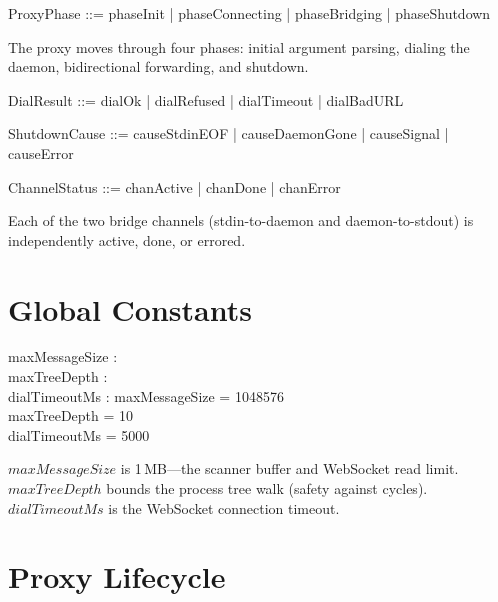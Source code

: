 \documentclass[a4paper,10pt,fleqn]{article}
\begin{document}
\begin{zed}
  ProxyPhase ::= %
  phaseInit | phaseConnecting | phaseBridging | phaseShutdown
\end{zed}

The proxy moves through four phases: initial argument parsing, dialing
the daemon, bidirectional forwarding, and shutdown.

\begin{zed}
  DialResult ::= dialOk | dialRefused | dialTimeout | dialBadURL
\end{zed}

\begin{zed}
  ShutdownCause ::= %
  causeStdinEOF | causeDaemonGone | causeSignal | causeError
\end{zed}

\begin{zed}
  ChannelStatus ::= chanActive | chanDone | chanError
\end{zed}

Each of the two bridge channels (stdin-to-daemon and daemon-to-stdout)
is independently active, done, or errored.

\section{Global Constants}

\begin{axdef}
  maxMessageSize : \nat \\
  maxTreeDepth : \nat \\
  dialTimeoutMs : \nat
  \where
  maxMessageSize = 1048576 \\
  maxTreeDepth = 10 \\
  dialTimeoutMs = 5000
\end{axdef}

$maxMessageSize$ is 1\,MB---the scanner buffer and WebSocket read limit.
$maxTreeDepth$ bounds the process tree walk (safety against cycles).
$dialTimeoutMs$ is the WebSocket connection timeout.

\section{Proxy Lifecycle}
\end{document}
